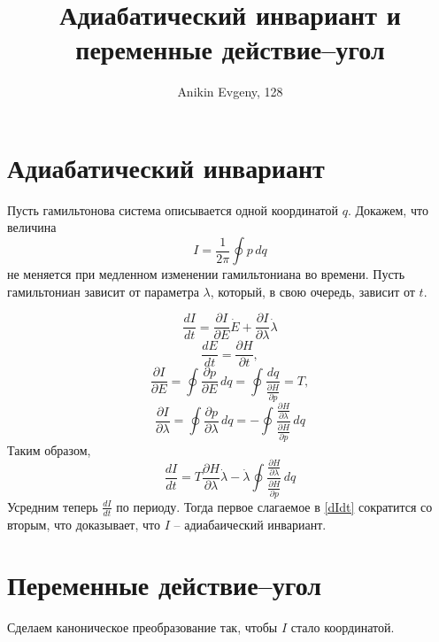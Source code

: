 \documentclass{article}
\title{Адиабатический инвариант и переменные действие--угол}
\author{Anikin Evgeny, 128}
\begin{document}
\maketitle
\section{Адиабатический инвариант}
Пусть гамильтонова система описывается одной координатой $q$. Докажем, что величина
\begin{equation}
	I = \frac{1}{2\pi} \oint p\,dq
\end{equation}
не меняется при медленном изменении гамильтониана во времени. Пусть гамильтониан 
зависит от параметра $\lambda$, который, в свою очередь, зависит от $t$. 

\begin{equation}
	\frac{dI}{dt} = \frac{\partial I}{\partial E} \dot{E} + 
        \frac{\partial I}{\partial \lambda} \dot{\lambda}
\end{equation}
\begin{equation}
	\frac{dE}{dt} = \frac{\partial H}{\partial t},
\end{equation}
\begin{equation}
	\frac{\partial I}{\partial E} = \oint \frac{\partial p}{\partial E} \,dq = 
        \oint \frac{dq}{\frac{\partial H}{\partial p}} = T,
\end{equation}
\begin{equation}
	\frac{\partial I}{\partial \lambda} = \oint \frac{\partial p}{\partial \lambda} \,dq = 
        -\oint \frac{\frac{\partial{H}}{\partial{\lambda}}}{\frac{\partial H}{\partial p}}\,dq
\end{equation}
Таким образом,
\begin{equation}
    \label{dIdt}
	\frac{dI}{dt} = T\frac{\partial H}{\partial \lambda} \dot{\lambda} 
        -\dot{\lambda}
        \oint \frac{\frac{\partial{H}}{\partial{\lambda}}}{\frac{\partial H}{\partial p}}\,dq
\end{equation}
Усредним теперь $\frac{dI}{dt}$ по периоду. Тогда первое слагаемое в \eqref{dIdt} сократится
со вторым, что доказывает, что $I$ -- адиабаический инвариант.
\section{Переменные действие--угол}
Сделаем каноническое преобразование так, чтобы $I$ стало координатой. 
\end{document}
